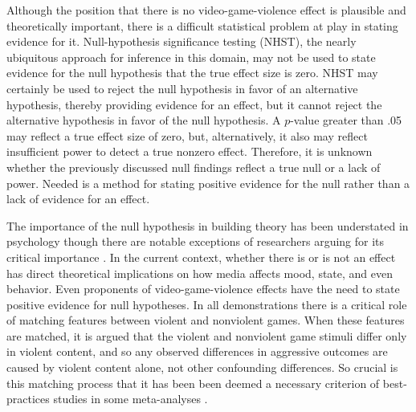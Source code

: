 \documentclass[fignum,nobf,man]{apa}
\begin{document}
Although the position that there is no video-game-violence effect is plausible and theoretically important, there is a difficult statistical problem at play in stating evidence for it. Null-hypothesis significance testing (NHST), the nearly ubiquitous approach for inference in this domain, may not be used to state evidence for the null hypothesis that the true effect size is zero.  NHST may certainly be used to reject the null hypothesis in favor of an alternative hypothesis, thereby providing evidence for an effect, but it cannot reject the alternative hypothesis in favor of the null hypothesis. A $p$-value greater than .05 may reflect a true effect size of zero, but, alternatively, it also may reflect insufficient power to detect a true nonzero effect. Therefore, it is unknown whether the previously discussed null findings reflect a true null or a lack of power.    Needed is a method for stating positive evidence for the null rather than a lack of evidence for an effect.

The importance of the null hypothesis in building theory has been understated in psychology though there are notable exceptions of researchers arguing for its critical importance \citep{Gallistel:2009,Rouder:etal:2009a}.  In the current context, whether there is or is not an effect has direct theoretical implications on how media affects mood, state, and even behavior.  Even proponents of video-game-violence effects have the need to state positive evidence for null hypotheses.  In all demonstrations there is a critical role of matching features between violent and nonviolent games.  When these features are matched, it is argued that the violent and nonviolent game stimuli differ only in violent content, and so any observed differences in aggressive outcomes are caused by violent content alone, not other confounding differences.  So crucial is this matching process that it has been been deemed a necessary criterion of best-practices studies in some meta-analyses \citep{Anderson:etal:2010}.
\end{document}
